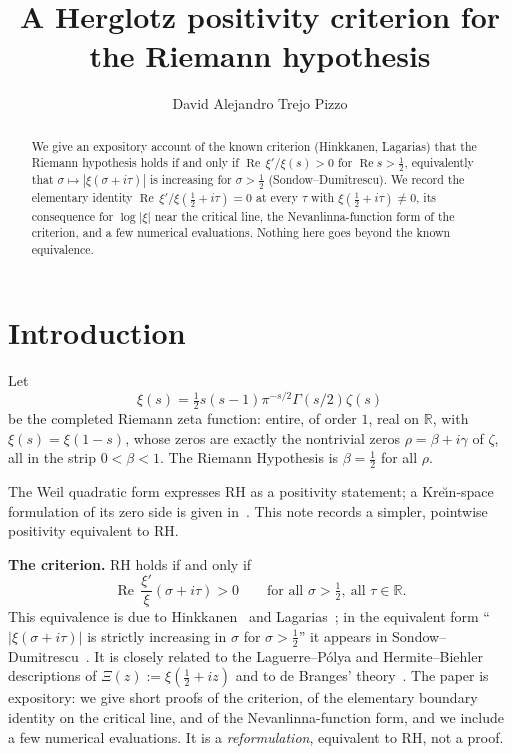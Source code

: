 \documentclass[11pt]{amsart}
\title[A Herglotz positivity criterion]{A Herglotz positivity criterion for the Riemann hypothesis}
\author{David Alejandro Trejo Pizzo}
\theoremstyle{definition}
\theoremstyle{remark}
\newcommand{\RH}{\mathrm{RH}}
\renewcommand{\Re}{\operatorname{Re}}
\newcommand{\half}{\tfrac12}
\begin{document}
\begin{abstract}
We give an expository account of the known criterion (Hinkkanen, Lagarias) that
the Riemann hypothesis holds if and only if $\Re\,\xi'/\xi(s)>0$ for $\Re s>\half$,
equivalently that $\sigma\mapsto|\xi(\sigma+i\tau)|$ is increasing for
$\sigma>\half$ (Sondow--Dumitrescu). We record the elementary identity
$\Re\,\xi'/\xi(\half+i\tau)=0$ at every $\tau$ with $\xi(\half+i\tau)\neq0$, its
consequence for $\log|\xi|$ near the critical line, the Nevanlinna-function form of
the criterion, and a few numerical evaluations. Nothing here goes beyond the known
equivalence.
\end{abstract}
\maketitle

\tableofcontents
\newpage

\section{Introduction}
Let
\[
\xi(s)=\half s(s-1)\pi^{-s/2}\Gamma(s/2)\zeta(s)
\]
be the completed Riemann zeta function: entire, of order $1$, real on $\mathbb R$,
with $\xi(s)=\xi(1-s)$, whose zeros are exactly the nontrivial zeros
$\rho=\beta+i\gamma$ of $\zeta$, all in the strip $0<\beta<1$. The Riemann
Hypothesis is $\beta=\half$ for all $\rho$.

The Weil quadratic form expresses $\RH$ as a positivity statement; a Kre\u\i n-space
formulation of its zero side is given in~\cite{RP8}. This note records a simpler,
pointwise positivity equivalent to $\RH$.

\textbf{The criterion.} $\RH$ holds if and only if
\begin{equation}\label{eq:crit}
\Re\,\frac{\xi'}{\xi}(\sigma+i\tau)>0\qquad\text{for all }\sigma>\half,\ \text{all }\tau\in\mathbb R.
\end{equation}
This equivalence is due to Hinkkanen~\cite{Hinkkanen} and Lagarias~\cite{Lagarias99};
in the equivalent form ``$|\xi(\sigma+i\tau)|$ is strictly increasing in $\sigma$ for
$\sigma>\half$'' it appears in Sondow--Dumitrescu~\cite{SondowDumitrescu}. It is
closely related to the Laguerre--P\'olya and Hermite--Biehler descriptions of
$\Xi(z):=\xi(\half+iz)$ and to de Branges' theory~\cite{deBranges,Lagarias}.
The paper is expository: we give short proofs of the criterion, of the elementary
boundary identity on the critical line, and of the Nevanlinna-function form, and we
include a few numerical evaluations. It is a \emph{reformulation}, equivalent to
$\RH$, not a proof.
\end{document}
